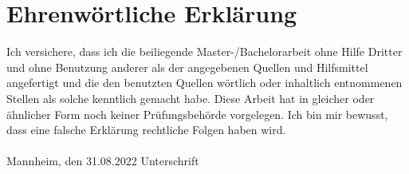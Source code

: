 \documentclass[11pt,titlepage,oneside,openany]{book}
\begin{document}
\newpage


\pagestyle{empty}


\section*{Ehrenw\"ortliche Erkl\"arung}
Ich versichere, dass ich die beiliegende Master-/Bachelorarbeit ohne Hilfe Dritter
und ohne Benutzung anderer als der angegebenen Quellen und Hilfsmittel
angefertigt und die den benutzten Quellen w\"ortlich oder inhaltlich
entnommenen Stellen als solche kenntlich gemacht habe. Diese Arbeit
hat in gleicher oder \"ahnlicher Form noch keiner Pr\"ufungsbeh\"orde
vorgelegen. Ich bin mir bewusst, dass eine falsche Erkl\"arung rechtliche Folgen haben
wird.
\\
\\

\noindent
Mannheim, den 31.08.2022 \hspace{4cm} Unterschrift
\end{document}
